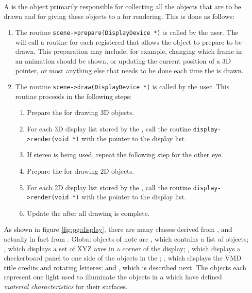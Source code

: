 A  is the object primarily responsible for collecting all the objects that are to be drawn and for giving these objects to a  for rendering.  This is done as follows:
\begin{enumerate}
  \item The routine {\tt scene->prepare(DisplayDevice *)} is called by the user.  The  will call a routine for each registered  that allows the object to prepare to be drawn.  This preparation may include, for example, changing which frame in an animation should be shown, or updating the current position of a 3D pointer, or most anything else that needs to be done each time the  is drawn.
  \item The routine {\tt scene->draw(DisplayDevice *)} is called by the user.  This routine proceeds in the following steps:
    \begin{enumerate}
      \item Prepare the  for drawing 3D objects.
      \item For each 3D display list stored by the , call the routine {\tt display->render(void *)} with the pointer to the display list.
      \item If stereo is being used, repeat the following step for the other eye.
      \item Prepare the  for drawing 2D objects.
      \item For each 2D display list stored by the , call the routine {\tt display->render(void *)} with the pointer to the display list.
      \item Update the  after all drawing is complete.
    \end{enumerate}
\end{enumerate}

As shown in figure \ref{fig:pg:display}, there are many classes derived from , and actually in fact from .  Global  objects of note are , which contains a list of  objects; , which displays a set of XYZ axes in a corner of the display; , which displays a checkerboard panel to one side of the objects in the ; , which displays the VMD title credits and rotating letteres; and , which is described next.  The  objects each represent one light used to illuminate the objects in a  which have defined {\em material characteristics} for their surfaces.

